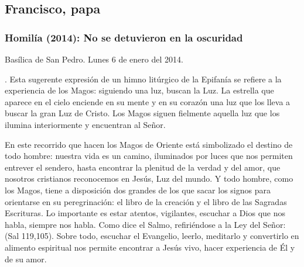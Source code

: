 {\subsection{Francisco, papa}

\subsubsection{Homilía (2014): No se detuvieron en la oscuridad}

Basílica de San Pedro. Lunes 6 de enero del 2014.

. Esta sugerente expresión de un himno litúrgico de la Epifanía se refiere a la experiencia de los Magos: siguiendo una luz, buscan la Luz. La estrella que aparece en el cielo enciende en su mente y en su corazón una luz que los lleva a buscar la gran Luz de Cristo. Los Magos siguen fielmente aquella luz que los ilumina interiormente y encuentran al Señor.

En este recorrido que hacen los Magos de Oriente está simbolizado el destino de todo hombre: nuestra vida es un camino, iluminados por luces que nos permiten entrever el sendero, hasta encontrar la plenitud de la verdad y del amor, que nosotros cristianos reconocemos en Jesús, Luz del mundo. Y todo hombre, como los Magos, tiene a disposición dos grandes  de los que sacar los signos para orientarse en su peregrinación: el libro de la creación y el libro de las Sagradas Escrituras. Lo importante es estar atentos, vigilantes, escuchar a Dios que nos habla, siempre nos habla. Como dice el Salmo, refiriéndose a la Ley del Señor:  (Sal 119,105). Sobre todo, escuchar el Evangelio, leerlo, meditarlo y convertirlo en alimento espiritual nos permite encontrar a Jesús vivo, hacer experiencia de Él y de su amor.

}

